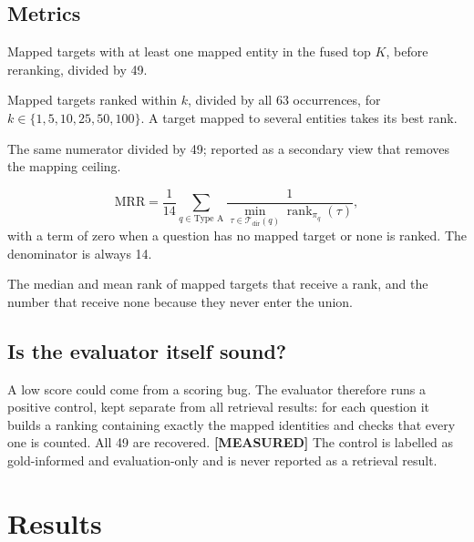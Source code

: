 \documentclass[11pt,a4paper]{article}
\newcommand{\cref}[1]{\autoref{#1}}
\theoremstyle{remark}
\DeclareMathOperator{\rank}{rank}
\newcommand{\vtag}[2]{{\sffamily\scriptsize\bfseries\textcolor{#1}{[#2]}}}
\newcommand{\Mtag}{\vtag{measgreen}{MEASURED}}
\begin{document}
\subsection{Metrics}

\begin{description}[leftmargin=0.5cm,style=nextline]
  \item[Candidate recall@$K$ (\cref{def:candrecall})] Mapped targets with at least one
        mapped entity in the fused top $K$, before reranking, divided by 49.
  \item[Final recall R@$k$ (\cref{def:recall})] Mapped targets ranked within $k$, divided
        by all 63 occurrences, for $k\in\{1,5,10,25,50,100\}$. A target mapped to several
        entities takes its best rank.
  \item[Mapped-only recall] The same numerator divided by 49; reported as a secondary
        view that removes the mapping ceiling.
  \item[Mean reciprocal rank]
        \begin{equation}
          \mathrm{MRR}=\frac{1}{14}\sum_{q\in\text{Type A}}\frac{1}{\min_{\tau\in\mathcal T_{\mathrm{dir}}(q)}\rank_{\pi_q}(\tau)},
        \end{equation}
        with a term of zero when a question has no mapped target or none is ranked. The
        denominator is always 14.
  \item[Observed and missing ranks] The median and mean rank of mapped targets that
        receive a rank, and the number that receive none because they never enter the
        union.
\end{description}

\subsection{Is the evaluator itself sound?}

A low score could come from a scoring bug. The evaluator therefore runs a positive
control, kept separate from all retrieval results: for each question it builds a ranking
containing exactly the mapped identities and checks that every one is counted. All 49 are
recovered. \Mtag{} The control is labelled as gold-informed and evaluation-only and is
never reported as a retrieval result.

\section{Results}
\label{sec:results}
\end{document}

